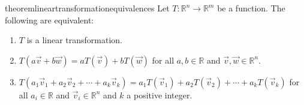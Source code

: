\begin{restatable}{theorem}{lineartransformationequivalences}\label{thm:linear_transformation_equivalences}
Let $T:\mathbb{R}^n\to\mathbb{R}^m$ be a function. The following are equivalent:
\begin{enumerate}
\item $T$ is a linear transformation.
\item $T(a\vec{v}+b\vec{w})=aT(\vec{v})+bT(\vec{w})$ for all $a,b \in \mathbb{R}$ 
and $\vec{v},\vec{w} \in \mathbb{R}^n$.
\item $T(a_1\vec{v}_1+a_2\vec{v}_2+\cdots+a_k\vec{v}_k)=
a_1T(\vec{v}_1)+a_2T(\vec{v}_2)+\cdots+a_kT(\vec{v}_k)$ 
for all $a_i \in \mathbb{R}$ and $\vec{v}_i \in \mathbb{R}^n$ and $k$ a positive integer.
\end{enumerate}
\end{restatable}

